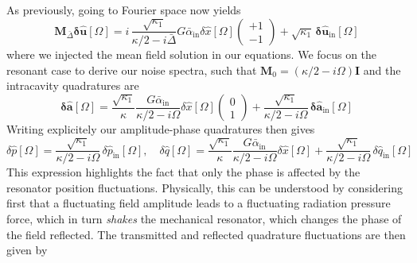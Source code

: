 As previously, going to Fourier space now yields 
\begin{equation}
     \mathbf{M}_{\bar\Delta} \mathbf{\delta \hat{u}}[\Omega]  = i \, \frac{\sqrt{\kappa_1}}{\kappa/2 -i\bar\Delta } G\bar{\alpha}_{\mathrm{in}} \delta \hat{x}[\Omega]   \begin{pmatrix} +1 \\ -1\end{pmatrix}  +\sqrt{\kappa_{\mathrm{1}}} \, \mathbf{\delta \hat{u}_{\mathrm{in}}}[\Omega]   
\end{equation}
where we injected the mean field solution in our equations. We focus on the resonant case to derive our noise spectra, such that $\mathbf{M}_0 = (\kappa/2 - i\Omega) \mathbf{I}$  and the intracavity quadratures are
\begin{equation}
  \mathbf{\delta \hat{a}}[\Omega] = \frac{\sqrt{\kappa_1}}{\kappa} \frac{ G \bar{\alpha}_{\mathrm{in}} }{\kappa/2 - i\Omega}\delta \hat{x}[\Omega] \begin{pmatrix} 0\\ 1\end{pmatrix}  +\frac{\sqrt{\kappa_{\mathrm{1}}}}{\kappa/2 - i\Omega} \, \mathbf{\delta \hat{a}_{\mathrm{in}}}[\Omega]  
\end{equation}
Writing explicitely our amplitude-phase quadratures then gives 
\begin{equation}
  \delta \hat{p}[\Omega] = \frac{\sqrt{\kappa_{\mathrm{1}}}}{\kappa/2 - i\Omega} \, \delta \hat{p}_{\mathrm{in}}[\Omega]  , \quad \delta \hat{q}[\Omega] = \frac{\sqrt{\kappa_1}}{\kappa} \frac{ G \bar{\alpha}_{\mathrm{in}} }{\kappa/2 - i\Omega}\delta \hat{x}[\Omega] + \frac{\sqrt{\kappa_{\mathrm{1}}}}{\kappa/2 - i\Omega} \, \delta \hat{q}_{\mathrm{in}}[\Omega]
\end{equation}
This expression highlights the fact that only the phase is affected by the resonator position fluctuations. Physically, this can be understood by considering first that a fluctuating field amplitude leads to a fluctuating radiation pressure force, which in turn \textit{shakes} the mechanical resonator, which changes the phase of the field reflected. 
The transmitted and reflected quadrature fluctuations are then given by
